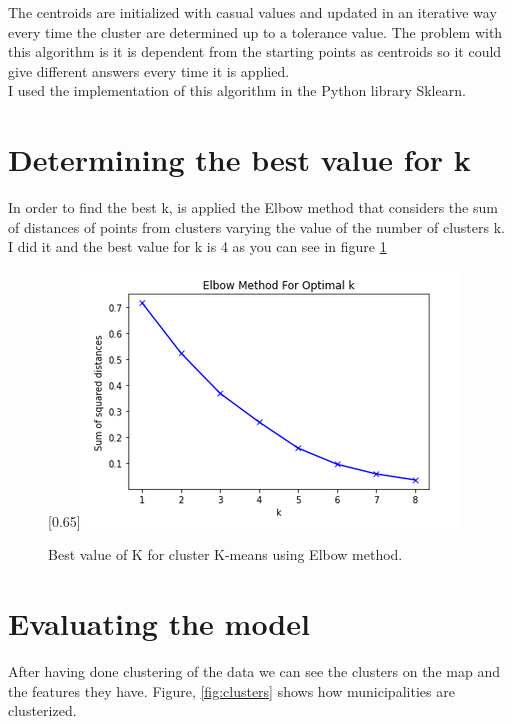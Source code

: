 \documentclass[a4paper, 12pt, oneside]{book}
\begin{document}
The centroids are initialized with casual values and updated in an iterative way every time the cluster are determined up to a tolerance value. The problem with this algorithm is it is dependent from the starting points as centroids so it could give different answers every time it is applied.\\

I used the implementation of this algorithm in the Python library Sklearn. 

\section*{Determining the best value for k}
\label{sec:k}
In order to find the best k, is applied the Elbow method \cite{elbow} that considers the sum of distances of points from clusters varying the value of the number of clusters k.\\

I did it and the best value for k is 4 as you can see in figure \ref{fig:bestK}



\begin{figure}[!htb]
		\centering
		\scalebox{0.65}[0.65]{\includegraphics{immagini/bestK.png}}
		\caption{Best value of K for cluster K-means using Elbow method.}
		\label{fig:bestK}
	\end{figure}


\section*{Evaluating the model}
\label{sec:model_eval}

After having done clustering of the data we can see the clusters on the map and the features they have. Figure, \ref{fig:clusters} shows how municipalities are clusterized.
\end{document}
